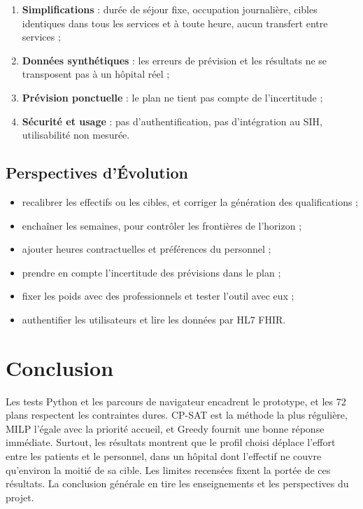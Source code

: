 \begin{enumerate}
    \item \textbf{Simplifications} : durée de séjour fixe, occupation journalière, cibles identiques dans tous les services et à toute heure, aucun transfert entre services ;
    \item \textbf{Données synthétiques} : les erreurs de prévision et les résultats ne se transposent pas à un hôpital réel ;
    \item \textbf{Prévision ponctuelle} : le plan ne tient pas compte de l'incertitude ;
    \item \textbf{Sécurité et usage} : pas d'authentification, pas d'intégration au SIH, utilisabilité non mesurée.
\end{enumerate}

\subsection{Perspectives d'Évolution}
\begin{itemize}
    \item recalibrer les effectifs ou les cibles, et corriger la génération des qualifications ;
    \item enchaîner les semaines, pour contrôler les frontières de l'horizon ;
    \item ajouter heures contractuelles et préférences du personnel ;
    \item prendre en compte l'incertitude des prévisions dans le plan ;
    \item fixer les poids avec des professionnels et tester l'outil avec eux ;
    \item authentifier les utilisateurs et lire les données par HL7 FHIR.
\end{itemize}

\section*{Conclusion}
Les \NbTestsPython{} tests Python et les \NbTestsNavigateur{} parcours de navigateur encadrent le prototype, et les 72 plans respectent les contraintes dures. CP-SAT est la méthode la plus régulière, MILP l'égale avec la priorité accueil, et Greedy fournit une bonne réponse immédiate. Surtout, les résultats montrent que le profil choisi déplace l'effort entre les patients et le personnel, dans un hôpital dont l'effectif ne couvre qu'environ la moitié de sa cible. Les limites recensées fixent la portée de ces résultats. La conclusion générale en tire les enseignements et les perspectives du projet.
